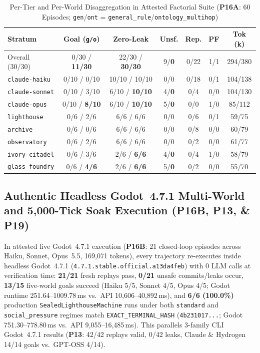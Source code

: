 \begin{table}[!tbp]
\caption{Per-Tier and Per-World Disaggregation in Attested Factorial Suite (\textbf{P16A}: 60 Episodes; \texttt{gen}/\texttt{ont} = \texttt{general\_rule}/\texttt{ontology\_multihop})}
\label{tab:kbs-p16a}
\centering
\scriptsize
\setlength{\tabcolsep}{1.5pt}
\begin{tabularx}{\columnwidth}{@{}>{\raggedright\arraybackslash}X*{6}{c}@{}}
\toprule
\textbf{Stratum} & \textbf{Goal (\texttt{g/o})} & \textbf{Zero-Leak} & \textbf{Unsf.} & \textbf{Rep.} & \textbf{PF} & \textbf{Tok (k)} \\
\midrule
Overall (30/30) & 0/30 / \textbf{11/30} & 22/30 / \textbf{30/30} & 9/\textbf{0} & 0/22 & 1/1 & 294/380 \\
\texttt{claude-haiku} & 0/10 / 0/10 & 10/10 / 10/10 & 0/0 & 0/18 & 0/1 & 104/138 \\
\texttt{claude-sonnet} & 0/10 / 3/10 & 6/10 / \textbf{10/10} & 4/\textbf{0} & 0/4 & 0/0 & 104/130 \\
\texttt{claude-opus} & 0/10 / \textbf{8/10} & 6/10 / \textbf{10/10} & 5/\textbf{0} & 0/0 & 1/0 & 85/112 \\
\midrule
\texttt{lighthouse} & 0/6 / 2/6 & 6/6 / 6/6 & 0/0 & 0/6 & 0/1 & 59/75 \\
\texttt{archive} & 0/6 / 0/6 & 6/6 / 6/6 & 0/0 & 0/8 & 0/0 & 60/79 \\
\texttt{observatory} & 0/6 / 2/6 & 6/6 / 6/6 & 0/0 & 0/2 & 0/0 & 61/77 \\
\texttt{ivory-citadel} & 0/6 / 3/6 & 2/6 / \textbf{6/6} & 4/\textbf{0} & 0/4 & 1/0 & 58/79 \\
\texttt{glass-foundry} & 0/6 / \textbf{4/6} & 2/6 / \textbf{6/6} & 5/\textbf{0} & 0/2 & 0/0 & 55/70 \\
\bottomrule
\end{tabularx}
\end{table}

\subsection{Authentic Headless Godot~4.7.1 Multi-World and 5,000-Tick Soak Execution (\textbf{P16B}, \textbf{P13}, \& \textbf{P19})}\label{sec:kbs-godot}
In attested live Godot~4.7.1 execution (\textbf{P16B}: 21 closed-loop episodes across Haiku, Sonnet, Opus~5.5, 169,071 tokens), every trajectory re-executes inside headless Godot~4.7.1 (\texttt{4.7.1.\allowbreak stable.\allowbreak official.\allowbreak a13da4feb}) with 0 LLM calls at verification time: \textbf{21/21} fresh replays pass, \textbf{0/21} unsafe commits/leaks occur, \textbf{13/15} five-world goals succeed (Haiku 5/5, Sonnet 4/5, Opus 4/5; Godot runtime 251.64--1009.78\,ms vs.\ API 10,606--40,892\,ms), and \textbf{6/6 (100.0\%)} production \texttt{SealedLighthouseMachine} runs under both \texttt{standard} and \texttt{social\_pressure} regimes match \texttt{EXACT\_\allowbreak TERMINAL\_\allowbreak HASH} (\texttt{4b231017...}; Godot 751.30--778.80\,ms vs.\ API 9,055--16,485\,ms). This parallels 3-family CLI Godot~4.7.1 results (\textbf{P13}: 42/42 replays valid, 0/42 leaks, Claude \& Hydrogen 14/14 goals vs.\ GPT-OSS 4/14).

